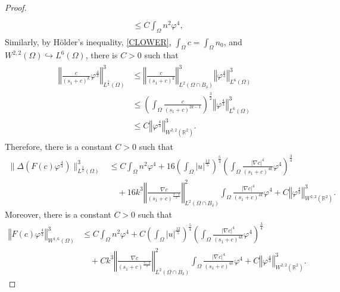\documentclass{amsart}
\numberwithin{equation}{section}
\newcommand{\R}{{ \mathbb{R}  }}
\newcommand{\bke}[1]{\left( #1 \right)}
\newcommand{\norm}[1]{\left\Vert #1 \right\Vert}
\begin{document}
\begin{proof}
\begin{align*}
\begin{aligned}
\\&\le  C\int_{\Omega}n^{2}\varphi^{4},
\end{aligned}
\end{align*}
Similarly, by H\"older's inequality, \eqref{CLOWER}, $\int_{\Omega}c=\int_{\Omega}n_{0}$, and $W^{2,2}(\Omega)\hookrightarrow L^{6}(\Omega)$,
there is $C>0$ such that %
\begin{align*}
\begin{aligned}
\norm{ \frac{ c }{(s_{1}+c)^{k}}  \varphi^{\frac{4}{3}}   }_{L^{\frac{3}{2}}(\Omega)}^{3} 
&\le \norm{ \frac{ c }{(s_{1}+c)^{k}}}_{L^{2}(\Omega \cap B_{\delta} )}^{3} \norm{  \varphi^{\frac{4}{3}}   }_{L^{6}(\Omega)}^{3} 
\\&  \le \left(\int_{\Omega} \frac{c}{(s_1 + c)^{2k-1}}\right)^{\frac{3}{2}} \norm{  \varphi^{\frac{4}{3}}   }_{L^{6}(\Omega)}^{3} 
\\&\le C \norm{\varphi^{\frac{4}{3}}}_{W^{2,2}(\R^{2})}^{3} .
\end{aligned}
\end{align*}
Therefore, there is a constant $C>0$ such that 
\[\begin{aligned}
\| \Delta(F(c)   \varphi^{\frac{4}{3}})  \|_{L^{\frac{3}{2}}(\Omega)}^{3}
&\leq C\int_{\Omega}n^{2}\varphi^{4} 
+ 16 \bke{\int_{\Omega}|u|^{\frac{12}{5}} }^{\frac{5}{4}}\bke{\int_{\Omega} \frac{|\nabla c|^{4}}{(s_{1}+c)^{4k}}\varphi^{4}}^{\frac{3}{4}} \\
&\quad + 16 k^3 \norm{\frac{\nabla c}{(s_{1}+c)^{\frac{3-k}{2}}}}_{L^{2}(\Omega\cap B_{\delta})}^{2}  \int_{\Omega} \frac{|\nabla c|^{4}}{(s_{1}+c)^{4k}}\varphi^{4}
 + C \norm{\varphi^{\frac{4}{3}}}_{W^{2,2}(\R^{2})}^{3}.
\end{aligned}\]
Moreover, there is a constant $C>0$ such that 
\[\begin{aligned}
\norm{   F(c)  \varphi^{\frac{4}{3}}}_{W^{1,6}(\Omega)}^{3}
&\leq C\int_{\Omega}n^{2}\varphi^{4} 
+ C\bke{\int_{\Omega}|u|^{\frac{12}{5}} }^{\frac{5}{4}}\bke{\int_{\Omega} \frac{|\nabla c|^{4}}{(s_{1}+c)^{4k}}\varphi^{4}}^{\frac{3}{4}} \\
&\quad + C k^3 \norm{\frac{\nabla c}{(s_{1}+c)^{\frac{3-k}{2}}}}_{L^{2}(\Omega\cap B_{\delta})}^{2}  \int_{\Omega} \frac{|\nabla c|^{4}}{(s_{1}+c)^{4k}}\varphi^{4}
 + C \norm{\varphi^{\frac{4}{3}}}_{W^{2,2}(\R^{2})}^{3}.
\end{aligned}\]


\end{proof}
\end{document}
